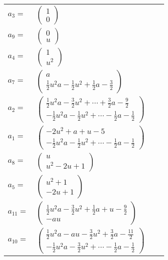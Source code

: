 \documentclass[1p]{elsarticle_modified}
\theoremstyle{definition}
\begin{document}
\begin{tabular}{m{7pt} m{180pt} m{7pt} m{180pt} }
\flushright $a_{3}=$&$\begin{pmatrix}1\\0\end{pmatrix}$ \\
\flushright $a_{9}=$&$\begin{pmatrix}0\\u\end{pmatrix}$ \\
\flushright $a_{4}=$&$\begin{pmatrix}1\\u^2\end{pmatrix}$ \\
\flushright $a_{7}=$&$\begin{pmatrix}a\\\frac{1}{2} u^2 a-\frac{1}{2} u^2+\frac{1}{2} a-\frac{3}{2}\end{pmatrix}$ \\
\flushright $a_{2}=$&$\begin{pmatrix}\frac{1}{2} u^2 a-\frac{3}{2} u^2+\cdots+\frac{3}{2} a-\frac{9}{2}\\-\frac{1}{2} u^2 a-\frac{1}{2} u^2+\cdots-\frac{1}{2} a-\frac{1}{2}\end{pmatrix}$ \\
\flushright $a_{1}=$&$\begin{pmatrix}-2 u^2+a+u-5\\-\frac{1}{2} u^2 a-\frac{1}{2} u^2+\cdots-\frac{1}{2} a-\frac{1}{2}\end{pmatrix}$ \\
\flushright $a_{8}=$&$\begin{pmatrix}u\\u^2-2 u+1\end{pmatrix}$ \\
\flushright $a_{5}=$&$\begin{pmatrix}u^2+1\\-2 u+1\end{pmatrix}$ \\
\flushright $a_{11}=$&$\begin{pmatrix}\frac{1}{2} u^2 a-\frac{3}{2} u^2+\frac{1}{2} a+u-\frac{9}{2}\\- a u\end{pmatrix}$ \\
\flushright $a_{10}=$&$\begin{pmatrix}\frac{1}{2} u^2 a- a u-\frac{3}{2} u^2+\frac{3}{2} a-\frac{11}{2}\\-\frac{1}{2} u^2 a-\frac{3}{2} u^2+\cdots-\frac{1}{2} a-\frac{1}{2}\end{pmatrix}$ \\

\end{tabular}
\end{document}
